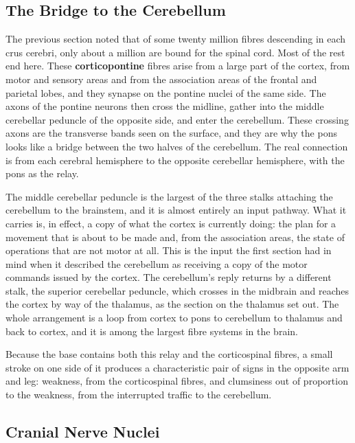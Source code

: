 \documentclass[11pt]{article}
\begin{document}
\subsection{The Bridge to the Cerebellum}

The previous section noted that of some twenty million fibres descending in each crus cerebri, only about a million are bound for the spinal cord. Most of the rest end here. These \textbf{corticopontine} fibres arise from a large part of the cortex, from motor and sensory areas and from the association areas of the frontal and parietal lobes, and they synapse on the pontine nuclei of the same side. The axons of the pontine neurons then cross the midline, gather into the middle cerebellar peduncle of the opposite side, and enter the cerebellum. These crossing axons are the transverse bands seen on the surface, and they are why the pons looks like a bridge between the two halves of the cerebellum. The real connection is from each cerebral hemisphere to the opposite cerebellar hemisphere, with the pons as the relay.

The middle cerebellar peduncle is the largest of the three stalks attaching the cerebellum to the brainstem, and it is almost entirely an input pathway. What it carries is, in effect, a copy of what the cortex is currently doing: the plan for a movement that is about to be made and, from the association areas, the state of operations that are not motor at all. This is the input the first section had in mind when it described the cerebellum as receiving a copy of the motor commands issued by the cortex. The cerebellum's reply returns by a different stalk, the superior cerebellar peduncle, which crosses in the midbrain and reaches the cortex by way of the thalamus, as the section on the thalamus set out. The whole arrangement is a loop from cortex to pons to cerebellum to thalamus and back to cortex, and it is among the largest fibre systems in the brain.

Because the base contains both this relay and the corticospinal fibres, a small stroke on one side of it produces a characteristic pair of signs in the opposite arm and leg: weakness, from the corticospinal fibres, and clumsiness out of proportion to the weakness, from the interrupted traffic to the cerebellum.

\subsection{Cranial Nerve Nuclei}
\end{document}
